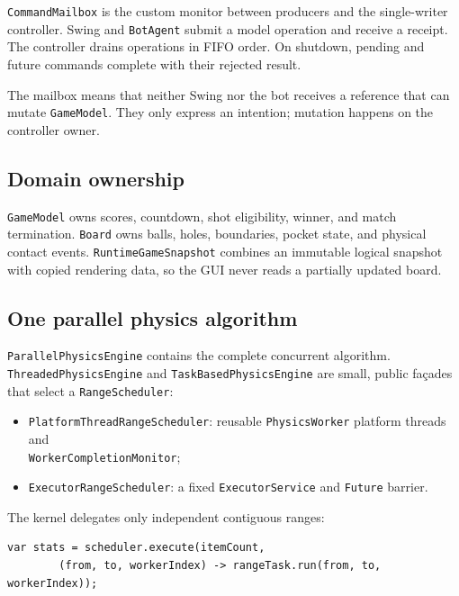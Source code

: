 \texttt{CommandMailbox} is the custom monitor between producers and the single-writer controller.
Swing and \texttt{BotAgent} submit a model operation and receive a receipt.
The controller drains operations in FIFO order.
On shutdown, pending and future commands complete with their rejected result.

The mailbox means that neither Swing nor the bot receives a reference that can mutate \texttt{GameModel}.
They only express an intention; mutation happens on the controller owner.

\subsection{Domain ownership}

\texttt{GameModel} owns scores, countdown, shot eligibility, winner, and match termination.
\texttt{Board} owns balls, holes, boundaries, pocket state, and physical contact events.
\texttt{RuntimeGameSnapshot} combines an immutable logical snapshot with copied rendering data, so the GUI never reads a partially updated board.

\subsection{One parallel physics algorithm}

\texttt{ParallelPhysicsEngine} contains the complete concurrent algorithm.
\texttt{ThreadedPhysicsEngine} and \texttt{TaskBasedPhysicsEngine} are small, public façades that select a \texttt{RangeScheduler}:

\begin{itemize}
    \item \texttt{PlatformThreadRangeScheduler}: reusable \texttt{PhysicsWorker} platform threads and \\ \texttt{WorkerCompletionMonitor};
    \item \texttt{ExecutorRangeScheduler}: a fixed \texttt{ExecutorService} and \texttt{Future} barrier.
\end{itemize}

The kernel delegates only independent contiguous ranges:

\begin{lstlisting}[style=codestyle,caption={The concurrency seam inside the shared kernel},label={lst:range-scheduler-seam}]
var stats = scheduler.execute(itemCount,
        (from, to, workerIndex) -> rangeTask.run(from, to, workerIndex));
\end{lstlisting}


